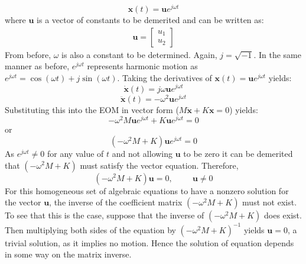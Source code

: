 \documentclass[12pt,letter]{article}
\numberwithin{ex}{section} %
\numberwithin{re}{section} %
\begin{document}
\begin{equation}
	\mathbf{x}(t) = \mathbf{u}e^{j\omega t}
\end{equation}
where $\mathbf{u}$ is a vector of constants to be demerited and can be written as:
\begin{eqnarray}
\mathbf{u}=  \begin{bmatrix} u_1 \\  u_2 \end{bmatrix}
\end{eqnarray}
From before, $\omega$ is also a constant to be determined. Again, $j=\sqrt{-1}$. In the same manner as before, $e^{j\omega t}$ represents harmonic motion as $e^{j\omega t} = \cos(\omega t) + j \sin(\omega t)$. Taking the derivatives of $\mathbf{x}(t) = \mathbf{u}e^{j\omega t}$ yields:
\begin{equation}
	\dot{\mathbf{x}}(t) = j\omega\mathbf{u}e^{j\omega t}
\end{equation}
\begin{equation}
	\ddot{\mathbf{x}}(t) = -\omega^2\mathbf{u}e^{j\omega t}
\end{equation}
Substituting this into the EOM in vector form ($M\mathbf{\ddot{x}} + K\mathbf{x} =0$) yields:
\begin{equation}
-\omega^2 M  \mathbf{u}e^{j\omega t} + K\mathbf{u}e^{j\omega t} =0
\end{equation}
or 
\begin{equation}
(-\omega^2 M  + K)\mathbf{u}e^{j\omega t} =0
\end{equation}
As $e^{j\omega t} \neq 0$ for any value of $t$ and not allowing $\mathbf{u}$ to be zero it can be demerited that $(-\omega^2 M  + K)$ must satisfy the vector equation. Therefore,
\begin{equation}
(-\omega^2 M  + K)\mathbf{u} =0, \hspace{1cm} \mathbf{u}\neq0
\end{equation}
For this homogeneous set of algebraic equations to have a nonzero solution for the vector $\mathbf{u}$, the inverse of the coefficient matrix $(-\omega^2 M  + K)$ must not exist. To see that this is the case, suppose that the inverse of $(-\omega^2 M  + K)$ does exist. Then multiplying both sides of the equation by $(-\omega^2 M  + K)^{-1}$ yields $\mathbf{u}=0$, a trivial solution, as it implies no motion. Hence the solution of equation depends in some way on the matrix inverse.
\end{document}
